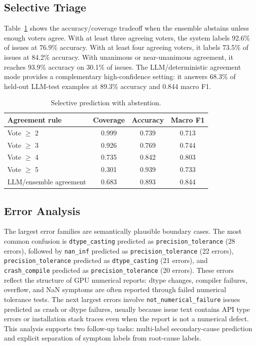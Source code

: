 \documentclass[conference]{IEEEtran}
\begin{document}
\subsection{Selective Triage}

Table~\ref{tab:abstain} shows the accuracy/coverage tradeoff when the ensemble
abstains unless enough voters agree. With at least three agreeing voters, the
system labels 92.6\% of issues at 76.9\% accuracy. With at least four agreeing
voters, it labels 73.5\% of issues at 84.2\% accuracy. With unanimous or
near-unanimous agreement, it reaches 93.9\% accuracy on 30.1\% of issues. The
LLM/deterministic agreement mode provides a complementary high-confidence
setting: it answers 68.3\% of held-out LLM-test examples at 89.3\% accuracy
and 0.844 macro F1.

\begin{table}[t]
\centering
\caption{Selective prediction with abstention.}
\label{tab:abstain}
\begin{tabular}{lccc}
\toprule
Agreement rule & Coverage & Accuracy & Macro F1 \\
\midrule
Vote $\geq$ 2 & 0.999 & 0.739 & 0.713 \\
Vote $\geq$ 3 & 0.926 & 0.769 & 0.744 \\
Vote $\geq$ 4 & 0.735 & 0.842 & 0.803 \\
Vote $\geq$ 5 & 0.301 & 0.939 & 0.733 \\
LLM/ensemble agreement & 0.683 & 0.893 & 0.844 \\
\bottomrule
\end{tabular}
\end{table}

\subsection{Error Analysis}

The largest error families are semantically plausible boundary cases. The most
common confusion is \texttt{dtype\_casting} predicted as
\texttt{precision\_tolerance} (28 errors), followed by \texttt{nan\_inf}
predicted as \texttt{precision\_tolerance} (22 errors),
\texttt{precision\_tolerance} predicted as \texttt{dtype\_casting} (21 errors),
and \texttt{crash\_compile} predicted as \texttt{precision\_tolerance} (20
errors). These errors reflect the structure of GPU numerical reports: dtype
changes, compiler failures, overflow, and NaN symptoms are often reported
through failed numerical tolerance tests. The next largest errors involve
\texttt{not\_numerical\_failure} issues predicted as crash or dtype failures,
usually because issue text contains API type errors or installation stack
traces even when the report is not a numerical defect. This analysis supports
two follow-up tasks: multi-label secondary-cause prediction and explicit
separation of symptom labels from root-cause labels.
\end{document}
